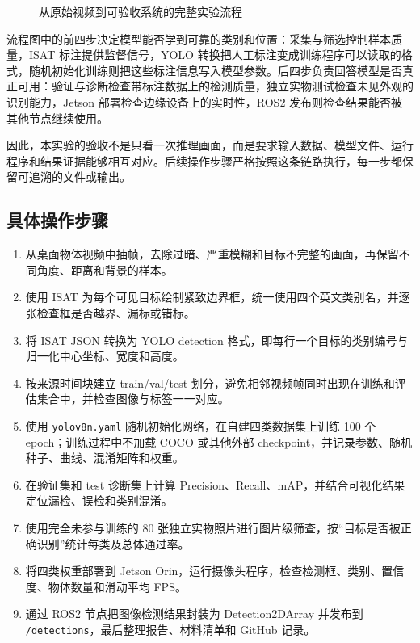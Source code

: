 \documentclass[11pt,conference,a4paper]{IEEEtran}
\newcommand{\code}[1]{\texttt{\footnotesize #1}}
\newcommand{\tightcaption}[1]{\caption{#1}\vspace{-0.4em}}
\begin{document}
\begin{figure}[H]
\centering
{}
\tightcaption{从原始视频到可验收系统的完整实验流程}
\end{figure}

流程图中的前四步决定模型能否学到可靠的类别和位置：采集与筛选控制样本质量，ISAT 标注提供监督信号，YOLO 转换把人工标注变成训练程序可以读取的格式，随机初始化训练则把这些标注信息写入模型参数。后四步负责回答模型是否真正可用：验证与诊断检查带标注数据上的检测质量，独立实物测试检查未见外观的识别能力，Jetson 部署检查边缘设备上的实时性，ROS2 发布则检查结果能否被其他节点继续使用。

因此，本实验的验收不是只看一次推理画面，而是要求输入数据、模型文件、运行程序和结果证据能够相互对应。后续操作步骤严格按照这条链路执行，每一步都保留可追溯的文件或输出。

\subsection{具体操作步骤}
\begin{enumerate}
\item 从桌面物体视频中抽帧，去除过暗、严重模糊和目标不完整的画面，再保留不同角度、距离和背景的样本。
\item 使用 ISAT 为每个可见目标绘制紧致边界框，统一使用四个英文类别名，并逐张检查框是否越界、漏标或错标。
\item 将 ISAT JSON 转换为 YOLO detection 格式，即每行一个目标的类别编号与归一化中心坐标、宽度和高度。
\item 按来源时间块建立 train/val/test 划分，避免相邻视频帧同时出现在训练和评估集合中，并检查图像与标签一一对应。
\item 使用 \code{yolov8n.yaml} 随机初始化网络，在自建四类数据集上训练 100 个 epoch；训练过程中不加载 COCO 或其他外部 checkpoint，并记录参数、随机种子、曲线、混淆矩阵和权重。
\item 在验证集和 test 诊断集上计算 Precision、Recall、mAP，并结合可视化结果定位漏检、误检和类别混淆。
\item 使用完全未参与训练的 80 张独立实物照片进行图片级筛查，按“目标是否被正确识别”统计每类及总体通过率。
\item 将四类权重部署到 Jetson Orin，运行摄像头程序，检查检测框、类别、置信度、物体数量和滑动平均 FPS。
\item 通过 ROS2 节点把图像检测结果封装为 Detection2DArray 并发布到 \code{/detections}，最后整理报告、材料清单和 GitHub 记录。
\end{enumerate}
\end{document}
